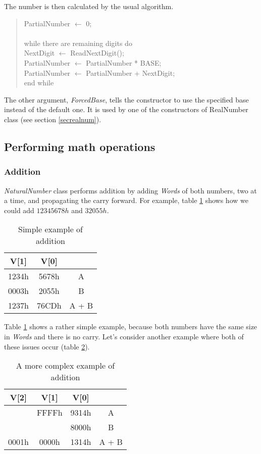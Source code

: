 \documentclass[a4paper,draft,12pt]{book}
\begin{document}
The number is then calculated by the usual algorithm.

\begin{quotation}
\noindent PartialNumber $\leftarrow$ 0;\\
\\
while there are remaining digits do\\
\indent NextDigit $\leftarrow$ ReadNextDigit();\\
\indent PartialNumber $\leftarrow$ PartialNumber * BASE;\\
\indent PartialNumber $\leftarrow$ PartialNumber + NextDigit;\\
end while
\end{quotation}

The other argument, \emph{ForcedBase}, tells the constructor to use
the specified base instead of the default one. It is used by one of
the constructors of RealNumber class (see section \ref{secrealnum}).

\subsection{Performing math operations}
\subsubsection{Addition}
\emph{NaturalNumber} class performs addition by adding \emph{Words}
of both numbers, two at a time, and propagating the carry forward. For
example, table \ref{tabadd} shows how we could add $12345678h$ and
$32055h$.

\begin{table}[h]
\begin{center}
\begin{tabular}{|c|c|c}
V[1]  & V[0]  &\\
\hline
1234h & 5678h & A\\
\hline
0003h & 2055h & B\\
\hline
1237h & 76CDh & A + B\\
\hline
\end{tabular}
\label{tabadd}
\caption{Simple example of addition}
\end{center}
\end{table}

Table \ref{tabadd} shows a rather simple example, because both numbers
have the same size in \emph{Words} and there is no carry. Let's consider
another example where both of these issues occur (table \ref{tabadd2}).

\begin{table}[h]
\begin{center}
\begin{tabular}{|c|c|c|c}
V[2]  & V[1]  & V[0] & \\
\hline
      & FFFFh & 9314h & A\\
\hline
      &       & 8000h & B\\
\hline
0001h & 0000h & 1314h & A + B\\
\hline
\end{tabular}
\label{tabadd2}
\caption{A more complex example of addition}
\end{center}
\end{table}
\end{document}
